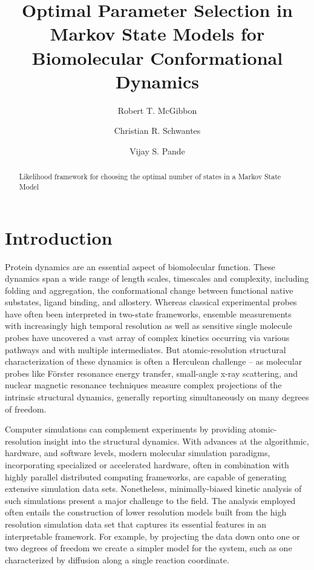 \documentclass[twocolumn,floatfix,nofootinbib,aps]{revtex4-1}
\begin{document}
\title{Optimal Parameter Selection in Markov State Models for Biomolecular Conformational Dynamics}
\author{Robert T. McGibbon}
\author{Christian R. Schwantes}
\author{Vijay S. Pande}

\begin{abstract}
Likelihood framework for choosing the optimal number of states in a
Markov State Model
\end{abstract}

\maketitle

\section{Introduction}
Protein dynamics are an essential aspect of biomolecular function. These dynamics span a wide range of length scales, timescales and complexity, including folding and aggregation, the conformational change between functional native substates, ligand binding, and allostery. Whereas classical experimental probes have often been interpreted in two-state frameworks, ensemble measurements with increasingly high temporal resolution as well as sensitive single molecule probes have uncovered a vast array of complex kinetics occurring via various pathways and with multiple intermediates. But atomic-resolution structural characterization of these dynamics is often a Herculean challenge -- as molecular probes like F\"{o}rster resonance energy transfer, small-angle x-ray scattering, and nuclear magnetic resonance techniques measure complex projections of the intrinsic structural dynamics, generally reporting simultaneously on many degrees of freedom.

Computer simulations can complement experiments by providing atomic-resolution insight into the structural dynamics. With advances at the algorithmic, hardware, and software levels, modern molecular simulation paradigms, incorporating specialized or accelerated hardware, often in combination with highly parallel distributed computing frameworks, are capable of generating extensive simulation data sets. Nonetheless, minimally-biased kinetic analysis of such simulations present a major challenge to the field. The analysis employed often entails the construction of lower resolution models built from the high resolution simulation data set that captures its essential features in an interpretable framework. For example, by projecting the data down onto one or two degrees of freedom we create a simpler model for the system, such as one characterized by diffusion along a single reaction coordinate.
\end{document}
